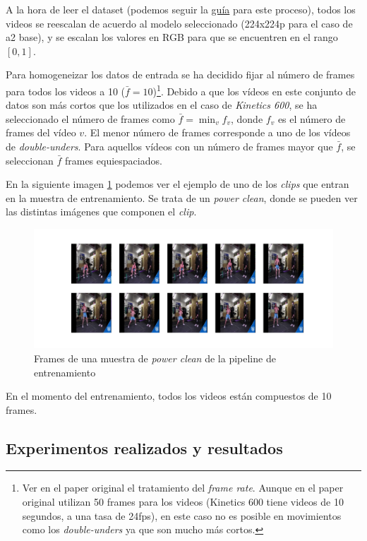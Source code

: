 A la hora de leer el dataset (podemos seguir la \href{https://plaguss.github.io/movinets_helper/how-to-guides/#how-to-ingest-a-dataset}{guía} para este proceso), todos los videos se reescalan de acuerdo al modelo seleccionado (224x224p para el caso de a2 base), y se escalan los valores en RGB para que se encuentren en el rango $[0, 1]$.

Para homogeneizar los datos de entrada se ha decidido fijar al número de frames para todos los videos a 10 ($\bar{f}=10$)\footnote{Ver en el paper original el tratamiento del \textit{frame rate}. Aunque en el paper original utilizan 50 frames para los videos (Kinetics 600 tiene videos de 10 segundos, a una tasa de 24fps), en este caso no es posible en movimientos como los \textit{double-unders} ya que son mucho más cortos.}. Debido a que los vídeos en este conjunto de datos son más cortos que los utilizados en el caso de \textit{Kinetics 600}, se ha seleccionado el número de frames como $\bar{f} = \min_v f_{v}$, donde $f_v$ es el número de frames del vídeo $v$. El menor número de frames corresponde a uno de los vídeos de \textit{double-unders}. Para aquellos vídeos con un número de frames mayor que $\bar{f}$, se seleccionan $\bar{f}$ frames equiespaciados.

En la siguiente imagen \ref{frames} podemos ver el ejemplo de uno de los \textit{clips} que entran en la muestra de entrenamiento. Se trata de un \textit{power clean}, donde se pueden ver las distintas imágenes que componen el \textit{clip}.

\begin{figure}[H]
    \centerline{\includegraphics[width=1.25\linewidth]{figs/frames.png}}
\caption{Frames de una muestra de \textit{power clean} de la pipeline de entrenamiento}\label{frames}
\end{figure}

En el momento del entrenamiento, todos los videos están compuestos de 10 frames.

\subsection{Experimentos realizados y resultados}

